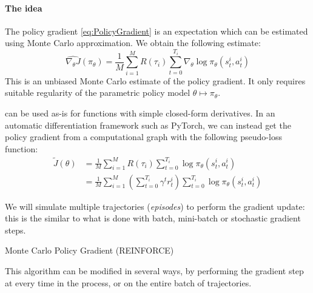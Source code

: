 \documentclass[12pt]{report}
\begin{document}
\paragraph{The idea} The policy gradient \eqref{eq:PolicyGradient} is an expectation which can be estimated using Monte Carlo approximation. We obtain the following estimate:
\begin{equation}\label{eq:MCPolicyGrad}
	\widehat{\nabla_\theta J}(\pi_\theta) =
	\frac{1}{M}\sum_{i=1}^M R(\tau_i)
	\sum_{t=0}^{T_i}
	\nabla_\theta
	\log\pi_\theta(s_t^i, a_t^i)
\end{equation}
This is an unbiased Monte Carlo estimate of the policy gradient. It only requires suitable regularity of the parametric policy model $\theta \longmapsto \pi_\theta$.


\begin{remark}\label{rmk:PolicyGradPseudoLoss}  can be used as-is for functions with simple closed-form derivatives.
In an automatic differentiation framework such as {\normalfont\sffamily PyTorch}, we can instead get the policy gradient from a computational graph with the following pseudo-loss function:
\begin{equation}\label{eq:PolicyGradPseudoLoss}
\begin{aligned}
	\tilde{J}(\theta)
	&= \frac{1}{M}\sum_{i=1}^M R(\tau_i)
	\sum_{t=0}^{T_i} \log\pi_\theta(s_t^i, a_t^i)\\
	&=
	\frac{1}{M}\sum_{i=1}^M
	\left(
		\sum_{t=0}^{T_i} \gamma^t r^i_{t}
	\right)
	\sum_{t=0}^{T_i} \log\pi_\theta(s_t^i, a_t^i)
\end{aligned}
\end{equation}
\end{remark}

We will simulate multiple trajectories (\textit{episodes}) to perform the gradient update: this is the similar to what is done with batch, mini-batch or stochastic gradient steps.

\begin{algorithm}
\caption{Monte Carlo Policy Gradient (REINFORCE)}\label{algo:REINFORCEbasic}
\end{algorithm}

This algorithm can be modified in several ways, by performing the gradient step at every time in the process, or on the entire batch of trajectories.
\end{document}
